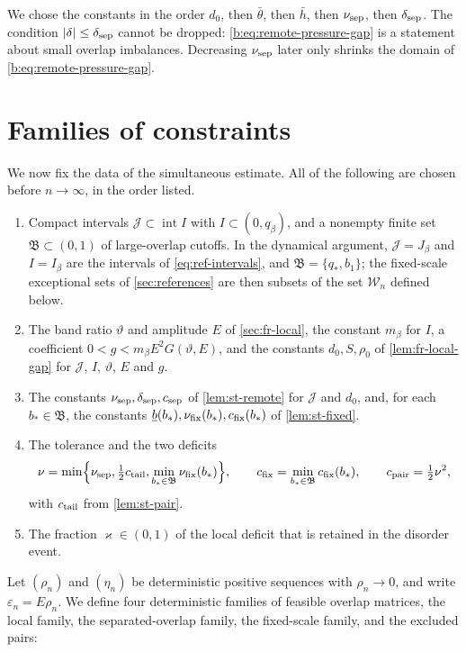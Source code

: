 We chose the constants in the order $d_0$, then $\bar\theta$, then $\bar h$, then $\nu_{\rm sep}$, then $\delta_{\rm sep}$. The condition $\lvert \delta\rvert\le\delta_{\rm sep}$ cannot be dropped: \eqref{b:eq:remote-pressure-gap} is a statement about small overlap imbalances. Decreasing $\nu_{\rm sep}$ later only shrinks the domain of \eqref{b:eq:remote-pressure-gap}.

\section{Families of constraints}\label{sec:st-families}

We now fix the data of the simultaneous estimate. All of the following are chosen before $n\to\infty$, in the order listed.
\begin{enumerate}
\item[(F1)] Compact intervals $\mathcal J\subset\operatorname{int}I$ with $I\subset(0,q_\beta)$, and a nonempty finite set $\mathfrak B\subset(0,1)$ of large-overlap cutoffs. In the dynamical argument, $\mathcal J=J_\beta$ and $I=I_\beta$ are the intervals of \eqref{eq:ref-intervals}, and $\mathfrak B=\{q_*,b_1\}$; the fixed-scale exceptional sets of \cref{sec:references} are then subsets of the set $\mathcal W_n$ defined below.
\item[(F2)] The band ratio $\vartheta$ and amplitude $E$ of \cref{sec:fr-local}, the constant $m_\beta$ for $I$, a coefficient $0<g<m_\beta E^2G(\vartheta,E)$, and the constants $d_0,S,\rho_0$ of \cref{lem:fr-local-gap} for $\mathcal J$, $I$, $\vartheta$, $E$ and $g$.
\item[(F3)] The constants $\nu_{\rm sep},\delta_{\rm sep},c_{\rm sep}$ of \cref{lem:st-remote} for $\mathcal J$ and $d_0$, and, for each $b_*\in\mathfrak B$, the constants $\underline b(b_*),\nu_{\rm fix}(b_*),c_{\rm fix}(b_*)$ of \cref{lem:st-fixed}.
\item[(F4)] The tolerance and the two deficits
\[
 \nu=\min\Bigl\{\nu_{\rm sep},\tfrac12c_{\rm tail},\min_{b_*\in\mathfrak B}\nu_{\rm fix}(b_*)\Bigr\},\qquad
 c_{\rm fix}=\min_{b_*\in\mathfrak B}c_{\rm fix}(b_*),\qquad c_{\rm pair}=\tfrac12\nu^2,
\]
with $c_{\rm tail}$ from \cref{lem:st-pair}.
\item[(F5)] The fraction $\varkappa\in(0,1)$ of the local deficit that is retained in the disorder event.
\end{enumerate}
Let $(\rho_n)$ and $(\eta_n)$ be deterministic positive sequences with $\rho_n\to0$, and write $\varepsilon_n=E\rho_n$. We define four deterministic families of feasible overlap matrices, the local family, the separated-overlap family, the fixed-scale family, and the excluded pairs:
